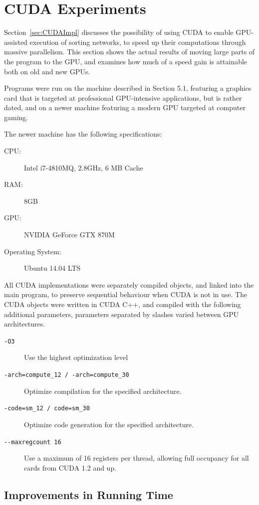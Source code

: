 \FloatBarrier
\section{CUDA Experiments}

Section~\ref{sec:CUDAImpl} discusses the possibility of using CUDA to enable GPU-assisted execution of sorting networks, to speed up their computations through massive parallelism. This section shows the actual results of moving large parts of the program to the GPU, and examines how much of a speed gain is attainable both on old and new GPUs.

Programs were run on the machine described in Section 5.1, featuring a graphics card that is targeted at professional GPU-intensive applications, but is rather dated, and on a newer machine featuring a modern GPU targeted at computer gaming.

The newer machine has the following specifications:

\begin{description}
\item[CPU:] Intel i7-4810MQ, 2.8GHz, 6 MB Cache
\item[RAM:] 8GB
\item[GPU:] NVIDIA GeForce GTX 870M 
\item[Operating System:] Ubuntu 14.04 LTS
\end{description}

All CUDA implementations were separately compiled objects, and linked into the main program, to preserve sequential behaviour when CUDA is not in use. The CUDA objects were written in CUDA C++, and compiled with the following additional parameters, parameters separated by slashes varied between GPU architectures.

\begin{description}
\item[\texttt{-O3}] Use the highest optimization level
\item[\texttt{-arch=compute\_12 / -arch=compute\_30}] Optimize compilation for the specified architecture.
\item[\texttt{-code=sm\_12 / code=sm\_30}] Optimize code generation for the specified architecture.
\item[\texttt{-{}-maxregcount 16}] Use a maximum of 16 registers per thread, allowing full occupancy for all cards from CUDA 1.2 and up. 
\end{description}


\subsection{Improvements in Running Time}


